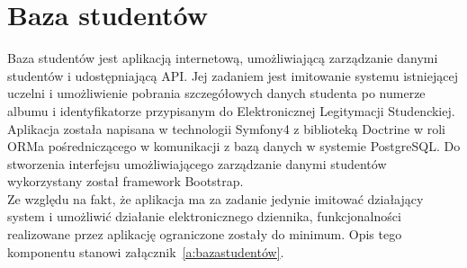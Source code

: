\documentclass[declaration,shortabstract, mgr]{iithesis}
\begin{document}
\section{Baza studentów}
\indent Baza studentów jest aplikacją internetową, umożliwiającą zarządzanie danymi studentów i udostępniającą API. Jej zadaniem jest imitowanie systemu istniejącej uczelni i umożliwienie pobrania szczegółowych danych studenta po numerze albumu i identyfikatorze przypisanym do Elektronicznej Legitymacji Studenckiej.\\
\indent Aplikacja została napisana w technologii Symfony4\cite{symfony} z biblioteką Doctrine\cite{doctrine} w roli ORMa pośredniczącego w komunikacji z bazą danych w systemie PostgreSQL. Do stworzenia interfejsu umożliwiającego zarządzanie danymi studentów wykorzystany został framework Bootstrap.\\
Ze względu na fakt, że aplikacja ma za zadanie jedynie imitować działający system i umożliwić działanie elektronicznego dziennika, funkcjonalności realizowane przez aplikację ograniczone zostały do minimum. Opis tego komponentu stanowi załącznik~\ref{a:bazastudentów}.
\end{document}
